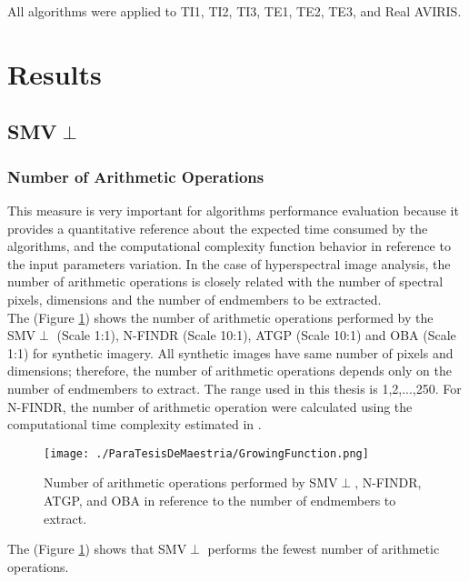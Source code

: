 \documentclass[11pt, oneside]{Thesis} %
\begin{document}
All algorithms were applied to TI1, TI2, TI3, TE1, TE2, TE3, and Real AVIRIS.




\section{Results}

\subsection{SMV$\perp$}

\subsubsection{Number of Arithmetic Operations}

This measure is very important for algorithms performance evaluation because 
it provides a quantitative reference about the expected time consumed by the 
algorithms, and the computational complexity function behavior in reference to 
the input parameters variation. In the case of hyperspectral image analysis, 
the number of arithmetic operations is closely related with the number of 
spectral pixels, dimensions and the number of endmembers to be extracted. \\

The (Figure \ref{PhotoGrowingFunctions}) shows the number of arithmetic operations 
performed by the SMV$\perp$ (Scale 1:1), N-FINDR (Scale 10:1), ATGP (Scale 10:1) 
and OBA (Scale 1:1) for synthetic imagery. All synthetic images have same number 
of pixels and dimensions; therefore, the number of arithmetic operations depends 
only on the number of endmembers to extract. The range used in this thesis is 
1,2,...,250. For N-FINDR, the number of arithmetic operation were calculated 
using the computational time complexity estimated in \cite{NFINDRCOMPLEXITY}.\\

\begin{figure}[ht]
  \centering
  \texttt{[image: ./ParaTesisDeMaestria/GrowingFunction.png]}
  \centering
  \caption{Number of arithmetic operations performed by SMV$\perp$, N-FINDR, ATGP, and 
  OBA in reference to the number of endmembers to extract.}
  \label{PhotoGrowingFunctions}
\end{figure}

The (Figure \ref{PhotoGrowingFunctions}) shows that SMV$\perp$ performs the fewest 
number of arithmetic operations. \\
\end{document}
